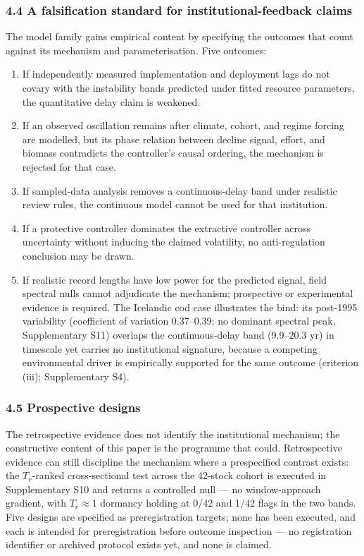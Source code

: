 \documentclass[11pt]{article}
\providecommand{\tightlist}{\setlength{\itemsep}{0pt}\setlength{\parskip}{0pt}}
\begin{document}
\subsubsection{4.4 A falsification standard for institutional-feedback
claims}\label{a-falsification-standard-for-institutional-feedback-claims}

The model family gains empirical content by specifying the outcomes that
count against its mechanism and parameterisation. Five outcomes:

\begin{enumerate}
\def\labelenumi{\arabic{enumi}.}
\tightlist
\item
  If independently measured implementation and deployment lags do not
  covary with the instability bands predicted under fitted resource
  parameters, the quantitative delay claim is weakened.
\item
  If an observed oscillation remains after climate, cohort, and regime
  forcing are modelled, but its phase relation between decline signal,
  effort, and biomass contradicts the controller's causal ordering, the
  mechanism is rejected for that case.
\item
  If sampled-data analysis removes a continuous-delay band under
  realistic review rules, the continuous model cannot be used for that
  institution.
\item
  If a protective controller dominates the extractive controller across
  uncertainty without inducing the claimed volatility, no
  anti-regulation conclusion may be drawn.
\item
  If realistic record lengths have low power for the predicted signal, field spectral nulls cannot adjudicate the mechanism; prospective or experimental evidence is required. The Icelandic cod case illustrates the bind: its post-1995 variability (coefficient of variation 0.37--0.39; no dominant spectral peak, Supplementary S11) overlaps the continuous-delay band (9.9--20.3 yr) in timescale yet carries no institutional signature, because a competing environmental driver is empirically supported for the same outcome (criterion (iii); Supplementary S4).
\end{enumerate}

\subsubsection{4.5 Prospective designs}\label{prospective-designs}

The retrospective evidence does not identify the institutional
mechanism; the constructive content of this paper is the programme that
could. Retrospective evidence can still discipline the mechanism where a prespecified contrast exists: the \(T_r\)-ranked cross-sectional test across the 42-stock cohort is executed in Supplementary S10 and returns a controlled null --- no window-approach gradient, with \(T_r \approx 1\) dormancy holding at 0/42 and 1/42 flags in the two bands. Five designs are specified as preregistration targets; none has been executed, and each is intended for preregistration before outcome
inspection --- no registration identifier or archived protocol exists
yet, and none is claimed.
\end{document}
